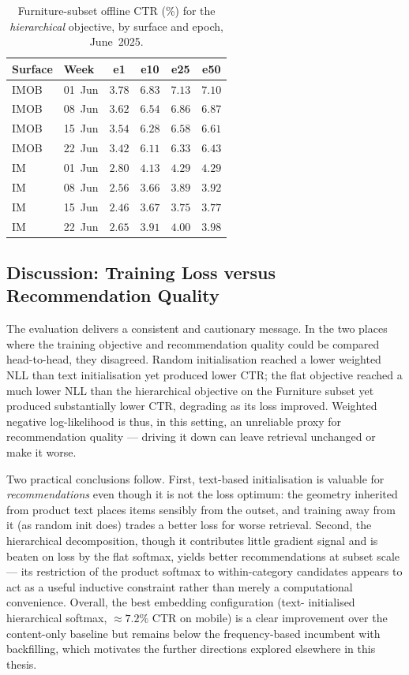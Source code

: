 \begin{table}[ht]
  \centering
  \caption{Furniture-subset offline CTR (\%) for the \emph{hierarchical}
           objective, by surface and epoch, June~2025.}
  \label{tab:emb-ctr-hier}
  \small
  \begin{tabular}{llcccc}
    \toprule
    Surface & Week & e1 & e10 & e25 & e50 \\
    \midrule
    IMOB & 01~Jun & $3.78$ & $6.83$ & $7.13$ & $7.10$ \\
    IMOB & 08~Jun & $3.62$ & $6.54$ & $6.86$ & $6.87$ \\
    IMOB & 15~Jun & $3.54$ & $6.28$ & $6.58$ & $6.61$ \\
    IMOB & 22~Jun & $3.42$ & $6.11$ & $6.33$ & $6.43$ \\
    \midrule
    IM   & 01~Jun & $2.80$ & $4.13$ & $4.29$ & $4.29$ \\
    IM   & 08~Jun & $2.56$ & $3.66$ & $3.89$ & $3.92$ \\
    IM   & 15~Jun & $2.46$ & $3.67$ & $3.75$ & $3.77$ \\
    IM   & 22~Jun & $2.65$ & $3.91$ & $4.00$ & $3.98$ \\
    \bottomrule
  \end{tabular}
\end{table}

\subsection{Discussion: Training Loss versus Recommendation Quality}
\label{sec:emb-discussion}
The evaluation delivers a consistent and cautionary message. In the two places
where the training objective and recommendation quality could be compared
head-to-head, they disagreed. Random initialisation reached a lower weighted NLL
than text initialisation yet produced lower CTR; the flat objective reached a
much lower NLL than the hierarchical objective on the Furniture subset yet
produced substantially lower CTR, degrading as its loss improved. Weighted
negative log-likelihood is thus, in this setting, an unreliable proxy for
recommendation quality --- driving it down can leave retrieval unchanged or make
it worse.

Two practical conclusions follow. First, text-based initialisation is valuable
for \emph{recommendations} even though it is not the loss optimum: the geometry
inherited from product text places items sensibly from the outset, and training
away from it (as random init does) trades a better loss for worse retrieval.
Second, the hierarchical decomposition, though it contributes little gradient
signal and is beaten on loss by the flat softmax, yields better recommendations
at subset scale --- its restriction of the product softmax to within-category
candidates appears to act as a useful inductive constraint rather than merely a
computational convenience. Overall, the best embedding configuration (text-%
initialised hierarchical softmax, $\approx 7.2\%$ CTR on mobile) is a clear
improvement over the content-only baseline but remains below the
frequency-based incumbent with backfilling, which motivates the further
directions explored elsewhere in this thesis.
